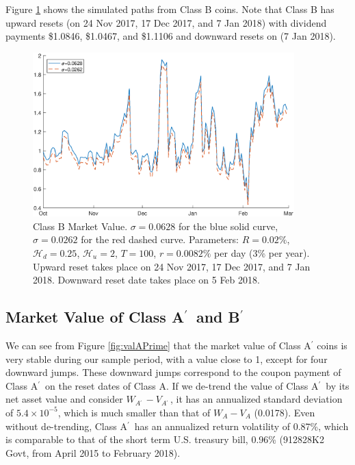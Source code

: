 \documentclass[draft, noinfoline]{ectaart}
\numberwithin{equation}{section}
\theoremstyle{plain}
\newcommand{\Ap}{A\ensuremath{^\prime}~}
\newcommand{\Bp}{B\ensuremath{^\prime}~}
\begin{document}
Figure \ref{fig:valB} shows the simulated paths from Class B coins. Note that Class B has upward resets (on 24 Nov 2017, 17 Dec 2017, and 7 Jan 2018) with dividend payments \$1.0846, \$1.0467, and \$1.1106 and downward resets on (7 Jan 2018).


\begin{figure}[!htb]
\begin{centering}
\includegraphics[width=0.9\textwidth]{WB}
\par\end{centering}
\caption{Class B Market Value. $\sigma = 0.0628$ for the blue solid curve, $\sigma=0.0262$ for the red dashed curve. Parameters: $R=0.02\%$, $\mathcal{H}_{d}=0.25$, $\mathcal{H}_{u} =2$, $T=100$, $r=0.0082\%$ per day (3\% per year). Upward reset takes place on 24 Nov 2017, 17 Dec 2017, and 7 Jan 2018. Downward reset date takes place on 5 Feb 2018.}
\label{fig:valB}
\end{figure}


\subsection{\texorpdfstring{Market Value of Class \Ap and \Bp}{Lg}}

We can see from Figure \ref{fig:valAPrime} that the market value of Class A$^\prime$ coins is very stable during our sample period, with a value close to 1, except for four downward jumps. These downward jumps correspond to the coupon payment of Class \Ap on the reset dates of Class A. If we de-trend the value of Class \Ap by its net asset value and consider $W_{\Ap}-V_{\Ap}$, it has an annualized standard deviation of $5.4\times 10^{-5}$, which is much smaller than that of $W_{A}-V_{A}$ (0.0178). Even without de-trending, Class \Ap has an annualized return volatility of 0.87\%, which is comparable to that of the short term U.S. treasury bill, 0.96\% (912828K2 Govt, from April 2015 to February 2018).
\end{document}
